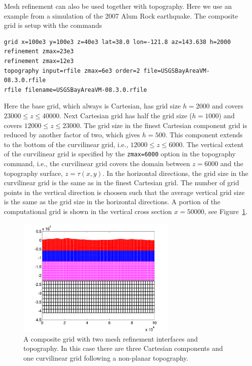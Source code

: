 \documentclass[11pt]{report}
\begin{document}
Mesh refinement can also be used together with topography. Here we use an example from a simulation
of the 2007 Alum Rock earthquake.
The composite grid is setup with the commands
\begin{verbatim}
grid x=100e3 y=100e3 z=40e3 lat=38.0 lon=-121.8 az=143.638 h=2000
refinement zmax=23e3
refinement zmax=12e3
topography input=rfile zmax=6e3 order=2 file=USGSBayAreaVM-08.3.0.rfile
rfile filename=USGSBayAreaVM-08.3.0.rfile
\end{verbatim}
Here the base grid, which always is Cartesian, has grid size $h=2000$ and covers $23000\leq z\leq
40000$. Next Cartesian grid has half the grid size ($h=1000$) and covers $12000\leq z\leq 23000$. The
grid size in the finest Cartesian component grid is reduced by another factor of two, which gives
$h=500$. This component extends to the bottom of the curvilinear grid, i.e., $12000\leq z\leq
6000$. The vertical extent of the curvilinear grid is specified by the \verb+zmax=6000+ option in
the topography command, i.e., the curvilinear grid covers the domain between $z=6000$ and the
topography surface, $z=\tau(x,y)$. In the horizontal directions, the grid size in the curvilinear
grid is the same as in the finest Cartesian grid. The number of grid points in the vertical
direction is choosen such that the average vertical grid size is the same as the grid size in the
horizontal directions.  A portion of the computational grid is shown in the vertical cross section
$x=50000$, see Figure~\ref{fig:efile-grid}.
%
\begin{figure}[htp]
  \begin{center}
    \includegraphics[width=0.7\textwidth]{figures/rfile-grid.png}
    \caption{A composite grid with two mesh refinement interfaces and topography. In this case there
      are three Cartesian components and one curvilinear grid following a non-planar topography.}
    \label{fig:efile-grid}
  \end{center}
\end{figure}
\end{document}
